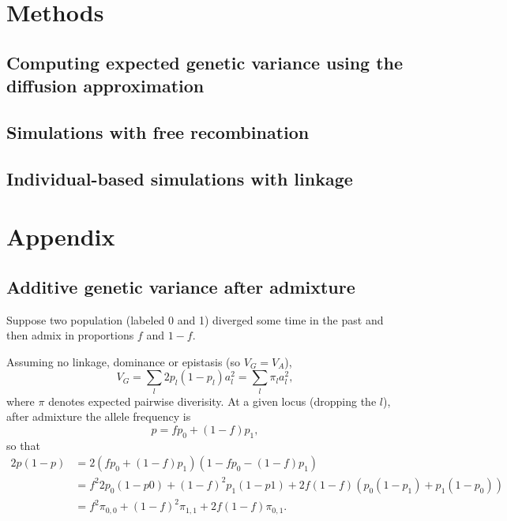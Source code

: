 \documentclass{article}
\begin{document}
\section*{Methods}

\subsection*{Computing expected genetic variance using the diffusion approximation}

\subsection*{Simulations with free recombination}

\subsection*{Individual-based simulations with linkage}




\section{Appendix}

\subsection{Additive genetic variance after admixture}

Suppose two population (labeled 0 and 1) diverged some time in the past and
then admix in proportions $f$ and $1-f$.

Assuming no linkage, dominance or epistasis (so \(V_G=V_A\)),
\[V_G = \sum_l 2p_l(1-p_l)a_l^2 = \sum_l \pi_l a_l^2,\]
where $\pi$ denotes expected pairwise diverisity.
At a given locus (dropping the $l$), after admixture the allele frequency is
\[p=f p_0 + (1-f) p_1,\]
so that
\begin{align*}
    2p(1-p) & = 2(f p_0 + (1-f) p_1)(1 - f p_0 - (1-f) p_1) \\
    & = f^2 2p_0(1-p0) + (1-f)^2 p_1(1-p1) + 2f(1-f) (p_0(1-p_1) + p_1(1-p_0)) \\
    & = f^2 \pi_{0,0} + (1-f)^2 \pi_{1,1} + 2f(1-f)\pi_{0,1}.
\end{align*}
\end{document}

